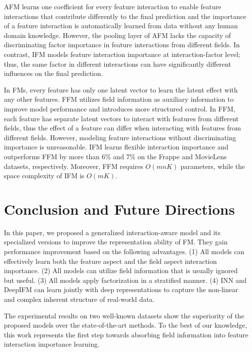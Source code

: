 \documentclass[letterpaper]{article} \usepackage{aaai19}  \usepackage{times}  \usepackage{helvet}  \usepackage{courier}  \usepackage{url}  \usepackage{graphicx}  \frenchspacing  \setlength{\pdfpagewidth}{8.5in}  \setlength{\pdfpageheight}{11in}  \usepackage{mathtools}
\begin{document}
AFM learns one coefficient for every feature interaction to enable feature interactions that contribute differently to the final prediction and the importance of a feature interaction is automatically learned from data without any human domain knowledge.
However, the pooling layer of AFM lacks the capacity of discriminating factor importance in feature interactions from different fields. In contrast, IFM models feature interaction importance at interaction-factor level; thus, the same factor in different interactions can have significantly different influences on the final prediction.

In FMs, every feature has only one latent vector to learn the latent effect with any other features. FFM utilizes field information as auxiliary information to improve model performance and introduces more structured control. In FFM, each feature has separate latent vectors to interact with features from different fields, thus the effect of a feature can differ when interacting with features from different fields. 
However, modeling feature interactions without discriminating importance is unreasonable. IFM learns flexible interaction importance and outperforms FFM by more than 6\% and 7\% on the Frappe and MovieLens datasets, respectively. Moreover, FFM requires $O(m n K)$ parameters, while the space complexity of IFM is $O(m K)$.

\section{Conclusion and Future Directions}


In this paper, we proposed a generalized interaction-aware model and its specialized versions to improve the representation ability of FM. They gain performance improvement based on the following advantages. (1) All models can effectively learn both the feature aspect and the field aspect interaction importance. (2) All models can utilize field information that is usually ignored but useful. (3) All models apply factorization in a stratified manner. (4) INN and DeepIFM can learn jointly with deep representations to capture the non-linear and complex inherent structure of real-world data.

The experimental results on two well-known datasets show the superiority of the proposed models over the state-of-the-art methods.
To the best of our knowledge, this work represents the first step towards absorbing field information into feature interaction importance learning.
\end{document}
